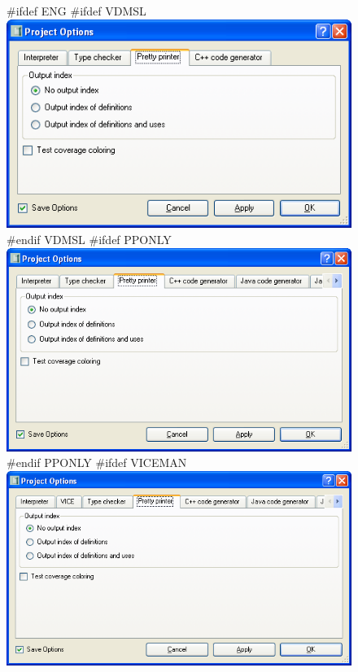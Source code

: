 \documentclass[\pformat,12pt]{article}
\newcommand{\guicmd}[1]{{\sf #1}}
\newcommand{\guicmd}[1]{{\gt #1}}
\begin{document}


\begin{figure}[tbh]
\begin{center}
#ifdef ENG
#ifdef VDMSL
\includegraphics[width=12cm]{ppOptions-slENG.png}
#endif VDMSL
#ifdef PPONLY
\includegraphics[width=12cm]{ppOptions-ppENG.png}
#endif PPONLY
#ifdef VICEMAN
\includegraphics[width=12cm]{ppOptions-viceENG.png}

\end{center}
\end{figure}
\end{document}
